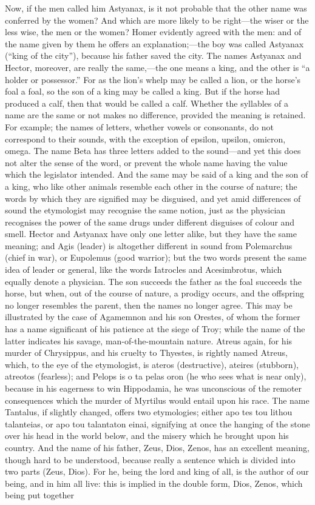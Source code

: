 \documentclass[11pt,letter]{article}
\begin{document}
\par  Now, if the men called him Astyanax, is it not probable that the other name was conferred by the women? And which are more likely to be right—the wiser or the less wise, the men or the women? Homer evidently agreed with the men: and of the name given by them he offers an explanation;—the boy was called Astyanax (“king of the city”), because his father saved the city. The names Astyanax and Hector, moreover, are really the same,—the one means a king, and the other is “a holder or possessor.” For as the lion’s whelp may be called a lion, or the horse’s foal a foal, so the son of a king may be called a king. But if the horse had produced a calf, then that would be called a calf. Whether the syllables of a name are the same or not makes no difference, provided the meaning is retained. For example; the names of letters, whether vowels or consonants, do not correspond to their sounds, with the exception of epsilon, upsilon, omicron, omega. The name Beta has three letters added to the sound—and yet this does not alter the sense of the word, or prevent the whole name having the value which the legislator intended. And the same may be said of a king and the son of a king, who like other animals resemble each other in the course of nature; the words by which they are signified may be disguised, and yet amid differences of sound the etymologist may recognise the same notion, just as the physician recognises the power of the same drugs under different disguises of colour and smell. Hector and Astyanax have only one letter alike, but they have the same meaning; and Agis (leader) is altogether different in sound from Polemarchus (chief in war), or Eupolemus (good warrior); but the two words present the same idea of leader or general, like the words Iatrocles and Acesimbrotus, which equally denote a physician. The son succeeds the father as the foal succeeds the horse, but when, out of the course of nature, a prodigy occurs, and the offspring no longer resembles the parent, then the names no longer agree. This may be illustrated by the case of Agamemnon and his son Orestes, of whom the former has a name significant of his patience at the siege of Troy; while the name of the latter indicates his savage, man-of-the-mountain nature. Atreus again, for his murder of Chrysippus, and his cruelty to Thyestes, is rightly named Atreus, which, to the eye of the etymologist, is ateros (destructive), ateires (stubborn), atreotos (fearless); and Pelops is o ta pelas oron (he who sees what is near only), because in his eagerness to win Hippodamia, he was unconscious of the remoter consequences which the murder of Myrtilus would entail upon his race. The name Tantalus, if slightly changed, offers two etymologies; either apo tes tou lithou talanteias, or apo tou talantaton einai, signifying at once the hanging of the stone over his head in the world below, and the misery which he brought upon his country. And the name of his father, Zeus, Dios, Zenos, has an excellent meaning, though hard to be understood, because really a sentence which is divided into two parts (Zeus, Dios). For he, being the lord and king of all, is the author of our being, and in him all live: this is implied in the double form, Dios, Zenos, which being put together 
\end{document}
